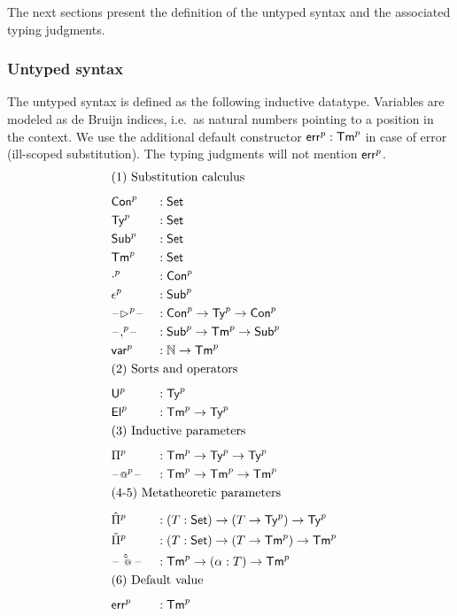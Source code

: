 The next sections present the definition of the untyped syntax and the
associated typing judgments.

\subsubsection{Untyped syntax}
The untyped syntax is defined as the following inductive datatype. Variables are
modeled as de Bruijn indices, i.e.\ as natural numbers pointing to a position in
the context. We use the additional default constructor ${\mathsf{err}}^p:{\mathsf{Tm}}^p$ in case of
error (ill-scoped substitution). The typing judgments will not mention ${\mathsf{err}}^p$.
\begin{alignat*}{5}
  & \rlap{(1) Substitution calculus} \\[0.5em]
  & \Conu && : \Set \\
  & \Tyu  && : \Set \\
  & \Subu  && : \Set \\
  & \Tmu  && : \Set \\
  & \emptyu && : \Conu \\
    & \epsilonu && : \Subu \\
  & \blank\extu\blank && : \Conu\ra\Tyu\ra\Conu \\
  & \blank\consu\blank && : \Subu\ra\Tmu\ra\Subu \\
  & \varu  && : \N \ra \Tmu \\
  & \rlap{(2) Sorts and operators} \\[0.5em]
  & \Uu && : \Tyu \\
  & \Elu && : \Tmu\ra\Tyu \\
  & \rlap{(3) Inductive parameters} \\[0.5em]
  & \Piu && : \Tmu\ra\Tyu\ra\Tyu \\
  & \blank\appu\blank && : \Tmu\ra\Tmu\ra \Tmu \\
  & \rlap{(4-5) Metatheoretic parameters} \\[0.5em]
  & \Pimu && : (T:\Set)\ra(T\ra\Tyu)\ra\Tyu \\
  & \Piiu && : (T:\Set)\ra(T\ra\Tmu)\ra\Tmu \\
  & \blank\appmu \blank && : \Tmu\ra(\alpha:T) \ra\Tmu\\
  & \rlap{(6) Default value} \\[0.5em]
  & \erru && : \Tmu
\end{alignat*}




